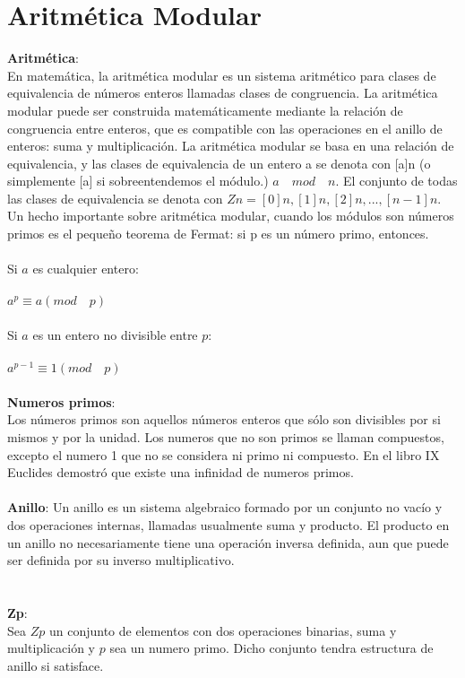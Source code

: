 \section{Aritmética Modular}
\textbf{Aritmética}:\\
En matemática, la aritmética modular es un sistema aritmético para clases de equivalencia de números enteros llamadas clases de congruencia.
La aritmética modular puede ser construida matemáticamente mediante la relación de congruencia entre enteros, que es compatible con las operaciones en el anillo de enteros: suma y multiplicación.
La aritmética modular se basa en una relación de equivalencia, y las clases de equivalencia de un entero a se denota con [a]n (o simplemente [a] si sobreentendemos el módulo.) $a\quad mod\quad n$. El conjunto de todas las clases de equivalencia se denota con $Zn = { [0]n, [1]n, [2]n,..., [n-1]n }.$
Un hecho importante sobre aritmética modular, cuando los módulos son números primos es el pequeño teorema de Fermat: si p es un número primo, entonces.\cite{modular}\\\\
Si $a$ es cualquier entero:\\\\
$a^p\equiv a(mod\quad p)$\\\\
Si $a$ es un entero no divisible entre $p$:\\\\
$a^{p-1}\equiv 1(mod\quad p)$\\\\
\textbf{Numeros primos}:\\
Los números primos son aquellos números enteros que sólo son divisibles por si mismos y por la unidad. Los numeros que no son primos se llaman compuestos, excepto el numero 1 que no se considera ni primo ni compuesto. En el libro IX Euclides demostró que existe una infinidad de numeros primos.\\\\
\textbf{Anillo}: Un anillo es un sistema algebraico formado por un conjunto no vacío y dos operaciones internas, llamadas usualmente suma y producto. El producto en un anillo no necesariamente tiene una operación inversa definida, aun que puede ser definida por su inverso multiplicativo.\cite{anil}\\\\ 
\\
\textbf{Zp}:\\
Sea $Zp$ un conjunto de elementos con dos operaciones binarias, suma y multiplicación y $p$ sea un numero primo. Dicho conjunto tendra estructura de anillo si satisface.\cite{zp}
